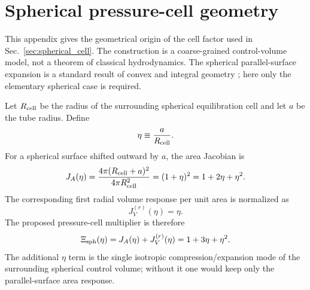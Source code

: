 \documentclass[aps,pra,preprint,longbibliography,nofootinbib]{revtex4-2}
\begin{document}
\section{Spherical pressure-cell geometry}
\label{app:spherical_geometry}

This appendix gives the geometrical origin of the cell factor used in
Sec.~\ref{sec:spherical_cell}.  The construction is a coarse-grained
control-volume model, not a theorem of classical hydrodynamics.  The
spherical parallel-surface expansion is a standard result of convex and
integral geometry \cite{Schneider2014}; here only the elementary spherical
case is required.

Let $R_{\rm cell}$ be the radius of the surrounding spherical equilibration
cell and let $a$ be the tube radius.  Define
\begin{equation}
  \eta\equiv \frac{a}{R_{\rm cell}} .
  \label{eq:app_eta_general}
\end{equation}
For a spherical surface shifted outward by $a$, the area Jacobian is
\begin{equation}
  J_A(\eta)
  =\frac{4\pi(R_{\rm cell}+a)^2}{4\pi R_{\rm cell}^2}
  =(1+\eta)^2
  =1+2\eta+\eta^2 .
  \label{eq:app_area_jacobian}
\end{equation}
The corresponding first radial volume response per unit area is normalized as
\begin{equation}
  J_V^{(r)}(\eta)=\eta .
  \label{eq:app_radial_volume}
\end{equation}
The proposed pressure-cell multiplier is therefore
\begin{equation}
  \Xi_{\rm sph}(\eta)=J_A(\eta)+J_V^{(r)}(\eta)
  =1+3\eta+\eta^2 .
  \label{eq:app_xi_general}
\end{equation}
The additional $\eta$ term is the single isotropic compression/expansion
mode of the surrounding spherical control volume; without it one would keep
only the parallel-surface area response.
\end{document}
